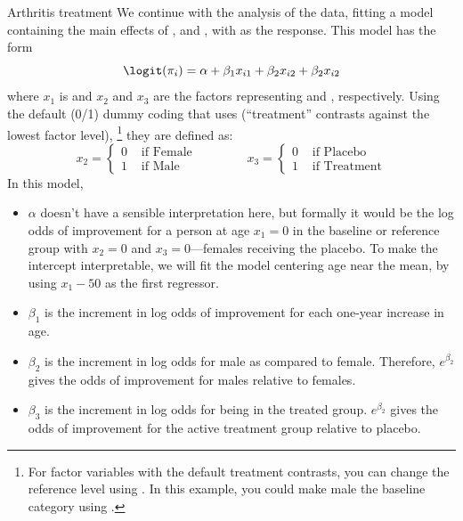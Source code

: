 \documentclass[11pt]{book}
\begin{document}
\begin{Example}{Arthritis treatment}
We continue with the analysis of the  data,
fitting a model containing the main effects of ,  and ,
with  as the response. This model has the form 
\begin{equation*}
  \logit ( \pi_{i}) = \alpha + \beta_1 x_{i1} + \beta_2 x_{i2} + \beta_2 x_{i2}
\end{equation*}
where $x_1$ is  and $x_2$ and $x_3$ are the factors 
representing  and , respectively.
Using the default (0/1) dummy coding that \R uses (``treatment'' contrasts against the lowest
factor level),%
\footnote{
For factor variables with the default treatment contrasts, you can change the
reference level using .  In this example, you could make 
male the baseline category using
.
}
they are defined as: 
\begin{equation*}
 x_2 = \left\{
    \begin{array}{ll}
    0  & \mbox{ if Female} \\
    1  & \mbox{ if Male} 
    \end{array}
    \right.
 \qquad\qquad
 x_3 = \left\{
    \begin{array}{ll}
    0  & \mbox{ if Placebo} \\
    1  & \mbox{ if Treatment}
    \end{array}
    \right.
\end{equation*}
In this model,
\begin{itemize}
\item $\alpha$ doesn't have a sensible interpretation here, but formally it would be
the log odds of improvement for a person at age $x_1=0$ in
the baseline or reference group
with $x_2=0$ and $x_3=0$---females receiving the placebo.  To make the intercept
interpretable, we will fit the model centering age near the mean,
by using $x_1 - 50$ as the first regressor.

\item \(\beta_1\) is the increment in log odds of improvement for each one-year
increase in age.
\item \(\beta_2\) is the increment in log odds for male
as compared to female.
Therefore, \(e^{ \beta_2 }\) gives the odds of improvement
for males relative to females.

\item \(\beta_3\) is the increment in log odds for being in the
treated group.  \(e^{ \beta_2 }\) gives the odds of
improvement for the active treatment group relative to
placebo.
\end{itemize}


\end{Example}
\end{document}
